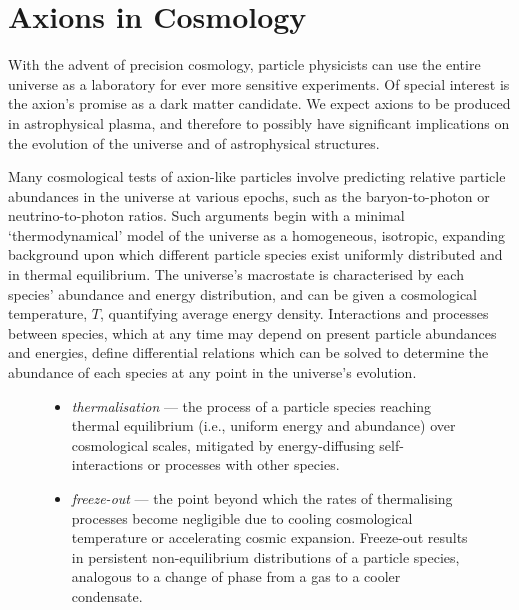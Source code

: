 \chapter{Axions in Cosmology}


With the advent of precision cosmology, particle physicists can use the entire universe as a laboratory for ever more sensitive experiments.
Of special interest is the axion's promise as a dark matter candidate.
We expect axions to be produced in astrophysical plasma, and therefore to possibly have significant implications on the evolution of the universe and of astrophysical structures.

Many cosmological tests of axion-like particles involve predicting relative particle abundances in the universe at various epochs, such as the baryon-to-photon or neutrino-to-photon ratios.
Such arguments begin with a minimal `thermodynamical' model of the universe as a homogeneous, isotropic, expanding background upon which different particle species exist uniformly distributed and in thermal equilibrium.
The universe's macrostate is characterised by each species' abundance and energy distribution, and can be given a cosmological temperature, $T$, quantifying average energy density.
Interactions and processes between species, which at any time may depend on present particle abundances and energies, define differential relations which can be solved to determine the abundance of each species at any point in the universe's evolution.


\begin{figure}[b!]
\begin{aside}
\begin{itemize}[leftmargin=0.75em]\setlength\itemsep{0.25ex}
	\item \emph{thermalisation}
---	the process of a particle species reaching thermal equilibrium (i.e., uniform energy and abundance) over cosmological scales, mitigated by energy-diffusing self-interactions or processes with other species.
	\item \emph{freeze-out}
---	the point beyond which the rates of thermalising processes become negligible due to cooling cosmological temperature or accelerating cosmic expansion. Freeze-out results in persistent non-equilibrium distributions of a particle species, analogous to a change of phase from a gas to a cooler condensate.
\end{itemize}
\end{aside}
\end{figure}

